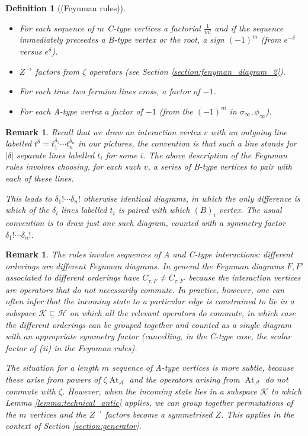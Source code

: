 \documentclass[english,letter paper,12pt,leqno]{article}
\theoremstyle{example}
\newtheorem{definition}[theorem]{Definition}
\newtheorem{remark}[theorem]{Remark}
\numberwithin{equation}{section}
\def\AA{\mathcal{A}}
\def\HH{\HH}
\def\HH{\mathcal{H}}
\def\KK{\mathcal{K}}
\DeclareMathOperator{\vAt}{At}
\begin{document}
\begin{definition}[(Feynman rules)]
\begin{itemize}
\item[(ii)] For each sequence of $m$ C-type vertices a factorial $\frac{1}{m!}$ and if the sequence immediately preceedes a B-type vertex or the root, a sign $(-1)^m$ (from $e^{-\delta}$ versus $e^\delta$).
\item[(iii)] $Z^{\,\rightarrow}$ factors from $\zeta$ operators (see Section \ref{section:fenyman_diagram_2}).
\item[(iv)] For each time two fermion lines cross, a factor of $-1$.
\item[(v)] For each A-type vertex a factor of $-1$ (from the $(-1)^m$ in $\sigma_\infty,\phi_\infty$).
\end{itemize}
\end{definition}

\begin{remark}\label{remark:boson_symmetry} Recall that we draw an interaction vertex $v$ with an outgoing line labelled $t^\delta = t_1^{\delta_1} \cdots t_n^{\delta_n}$ in our pictures, the convention is that such a line stands for $|\delta|$ separate lines labelled $t_i$ for some $i$. The above description of the Feynman rules involves choosing, for each such $v$, a series of B-type vertices to pair with each of these lines. 

This leads to $\delta_1! \cdots \delta_n!$ otherwise identical diagrams, in which the only difference is \emph{which} of the $\delta_i$ lines labelled $t_i$ is paired with which $(B)_i$ vertex. The usual convention is to draw just one such diagram, counted with a symmetry factor $\delta_1! \cdots \delta_n!$.
\end{remark}

\begin{remark}\label{remark:symmetry_A_type} The rules involve \emph{sequences} of A and C-type interactions: different orderings are different Feynman diagrams. In general the Feynman diagrams $F,F'$ associated to different orderings have $C_{\tau, F} \neq C_{\tau, F'}$ because the interaction vertices are operators that do not necessarily commute. In practice, however, one can often infer that the incoming state to a particular edge is constrained to lie in a subspace $\KK \subseteq \HH$ on which all the relevant operators \emph{do} commute, in which case the different orderings can be grouped together and counted as a single diagram with an appropriate symmetry factor (cancelling, in the C-type case, the scalar factor of (ii) in the Feynman rules).

The situation for a length $m$ sequence of A-type vertices is more subtle, because these arise from powers of $\zeta \vAt_{\AA}$ and the operators arising from $\vAt_{\AA}$ do not commute with $\zeta$. However, when the incoming state lies in a subspace $\KK$ to which Lemma \ref{lemma:technical_antic} applies, we can group together permutations of the $m$ vertices and the $Z^{\,\rightarrow}$ factors become a symmetrised $Z$. This applies in the context of Section \ref{section:generator}.
\end{remark}
\end{document}
